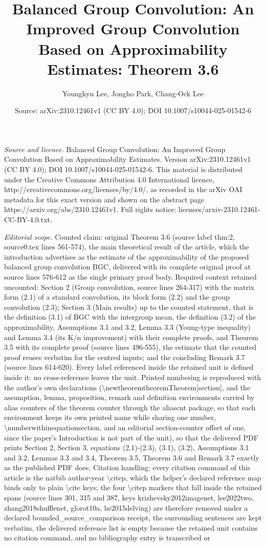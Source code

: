 \documentclass[10pt,a4paper]{amsart}
\title[Approximability estimate of balanced group convolution]{Balanced Group Convolution: An Improved Group Convolution Based on Approximability Estimates: Theorem 3.6}
\author{Youngkyu Lee, Jongho Park, Chang-Ock Lee}
\date{Source: arXiv:2310.12461v1 (CC BY 4.0); DOI 10.1007/s10044-025-01542-6}
\numberwithin{equation}{section}
\theoremstyle{remark}
\begin{document}
\maketitle
{\sloppy\noindent\emph{Source and licence.} Balanced Group Convolution: An Improved Group Convolution Based on Approximability Estimates. Version arXiv:2310.12461v1 (CC BY 4.0); DOI 10.1007/s10044-025-01542-6. This material is distributed under the Creative Commons Attribution 4.0 International licence, http://creativecommons.org/licenses/by/4.0/, as recorded in the arXiv OAI metadata for this exact version and shown on the abstract page https://arxiv.org/abs/2310.12461v1. Full rights notice: licenses/arxiv-2310.12461-CC-BY-4.0.txt.\par}\smallskip
\noindent\textit{Editorial scope.} Counted claim: original Theorem 3.6 (source label thm:2, source0.tex lines 561-574), the main theoretical result of the article, which the introduction advertises as the estimate of the approximability of the proposed balanced group convolution BGC, delivered with its complete original proof at source lines 576-612 as the single primary proof body. Required context retained uncounted: Section 2 (Group convolution, source lines 264-317) with the matrix form (2.1) of a standard convolution, its block form (2.2) and the group convolution (2.3); Section 3 (Main results) up to the counted statement, that is the definition (3.1) of BGC with the intergroup mean, the definition (3.2) of the approximability, Assumptions 3.1 and 3.2, Lemma 3.3 (Young-type inequality) and Lemma 3.4 (its K/n improvement) with their complete proofs, and Theorem 3.5 with its complete proof (source lines 496-555), the estimate that the counted proof reuses verbatim for the centred inputs; and the concluding Remark 3.7 (source lines 614-620). Every label referenced inside the retained unit is defined inside it: no cross-reference leaves the unit. Printed numbering is reproduced with the author's own declarations (\textbackslash{}newtheorem{theorem}{Theorem}[section], and the assumption, lemma, proposition, remark and definition environments carried by alias counters of the theorem counter through the aliascnt package, so that each environment keeps its own printed name while sharing one number, \textbackslash{}numberwithin{equation}{section}, and an editorial section-counter offset of one, since the paper's Introduction is not part of the unit), so that the delivered PDF prints Section 2, Section 3, equations (2.1)-(2.3), (3.1), (3.2), Assumptions 3.1 and 3.2, Lemmas 3.3 and 3.4, Theorem 3.5, Theorem 3.6 and Remark 3.7 exactly as the published PDF does. Citation handling: every citation command of this article is the natbib author-year \textbackslash{}citep, which the helper's declared reference map binds only to plain \textbackslash{}cite keys; the four \textbackslash{}citep markers that fall inside the retained spans (source lines 301, 315 and 387, keys krizhevsky2012imagenet, lee2022two, zhang2018shufflenet, glorot10a, he2015delving) are therefore removed under a declared bounded\_source\_comparison receipt, the surrounding sentences are kept verbatim, the delivered reference list is empty because the retained unit contains no citation command, and no bibliography entry is transcribed or 
\end{document}
